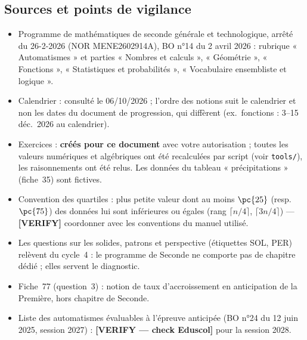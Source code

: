 \subsection*{Sources et points de vigilance}
\begin{itemize}[leftmargin=1.2em,itemsep=2pt]
  \item Programme de mathématiques de seconde générale et technologique, arrêté du 26-2-2026 (NOR MENE2602914A), BO n°14 du 2 avril 2026 : rubrique « Automatismes » et parties « Nombres et calculs », « Géométrie », « Fonctions », « Statistiques et probabilités », « Vocabulaire ensembliste et logique ».
  \item Calendrier : consulté le 06/10/2026 ; l'ordre des notions suit le calendrier et non les dates du document de progression, qui diffèrent (ex.\ fonctions : 3--15 déc.\ 2026 au calendrier).
  \item Exercices : \textbf{créés pour ce document} avec votre autorisation ; toutes les valeurs numériques et algébriques ont été recalculées par script (voir \texttt{tools/}), les raisonnements ont été relus. Les données du tableau « précipitations » (fiche~35) sont fictives.
  \item Convention des quartiles : plus petite valeur dont au moins $\pc{25}$ (resp.\ $\pc{75}$) des données lui sont inférieures ou égales (rang $\lceil n/4\rceil$, $\lceil3n/4\rceil$) --- \textbf{[VERIFY]} coordonner avec les conventions du manuel utilisé.
  \item Les questions sur les solides, patrons et perspective (étiquettes SOL, PER) relèvent du cycle~4 : le programme de Seconde ne comporte pas de chapitre dédié ; elles servent le diagnostic.
  \item Fiche~77 (question~3) : notion de taux d'accroissement en anticipation de la Première, hors chapitre de Seconde.
  \item Liste des automatismes évaluables à l'épreuve anticipée (BO n°24 du 12 juin 2025, session 2027) : \textbf{[VERIFY --- check Eduscol]} pour la session 2028.
\end{itemize}
